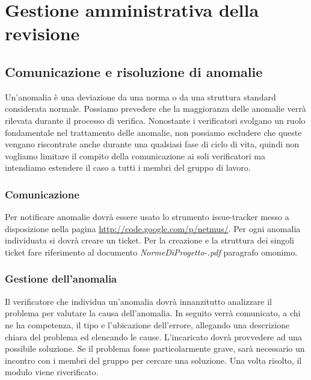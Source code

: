 
\chapter{Gestione amministrativa della \\revisione}
\thispagestyle{fancy} %

\section{Comunicazione e risoluzione di anomalie}

Un'anomalia \`e una deviazione da una norma o da una struttura standard
considerata normale. Possiamo prevedere che la maggioranza delle anomalie verr\`a 
rilevata durante il processo di verifica. Nonostante i verificatori svolgano un
ruolo fondamentale nel trattamento delle anomalie, non possiamo escludere che
queste vengano riscontrate anche durante una qualsiasi fase di ciclo di vita,
quindi non vogliamo limitare il compito della comunicazione ai soli verificatori ma 
intendiamo estendere il caso a tutti i membri del gruppo di lavoro.

\subsection{Comunicazione}

Per notificare anomalie dovr\`a essere usato lo strumento issue-tracker messo a
disposizione nella pagina \url{http://code.google.com/p/netmus/}. Per ogni
anomalia individuata si dovr\`a creare un ticket. Per la creazione e la struttura dei
singoli ticket fare riferimento al documento \emph{NormeDiProgetto-\versionenormeprogetto.pdf} paragrafo omonimo.


\subsection{Gestione dell'anomalia}

Il verificatore che individua un'anomalia dovr\`a innanzitutto analizzare il
problema per valutare la causa dell'anomalia.
In seguito verr\`a comunicato, a chi ne ha competenza, il tipo e l'ubicazione
dell'errore, allegando una descrizione chiara del problema ed elencando le
cause. L'incaricato dovr\`a provvedere ad una possibile soluzione. Se il
problema fosse particolarmente grave, sar\`a necessario un incontro con i membri 
del gruppo per cercare una soluzione. Una volta risolto, il modulo viene
riverificato.

